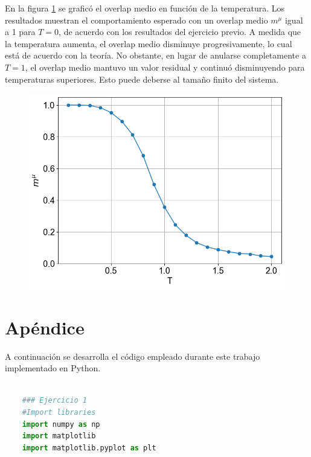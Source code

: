 \documentclass[aps,prb,twocolumn,superscriptaddress,floatfix,longbibliography]{revtex4-2}
\newcounter{para}
\begin{document}
En la figura \ref{fig:ej2_overlap_vs_T} se graficó el overlap medio en función de la temperatura. Los resultados muestran el comportamiento esperado con un overlap medio \( m^\mu \) igual a 1 para \( T = 0 \), de acuerdo con los resultados del ejercicio previo. A medida que la temperatura aumenta, el overlap medio disminuye progresivamente, lo cual está de acuerdo con la teoría. No obstante, en lugar de anularse completamente a \( T = 1 \), el overlap medio mantuvo un valor residual y continuó disminuyendo para temperaturas superiores. Esto puede deberse al tamaño finito del sistema.

\begin{figure}[h]
  \includegraphics[clip=true,width=\columnwidth]{../ej2_overlap_vs_T.png}
  \caption{}
   \label{fig:ej2_overlap_vs_T}
\end{figure}





\onecolumngrid


\section*{Apéndice}
A continuación se desarrolla el código empleado durante este trabajo implementado en Python.




\begin{lstlisting}[language=Python]
    
    ### Ejercicio 1
    #Import libraries
    import numpy as np
    import matplotlib
    import matplotlib.pyplot as plt
    
\end{lstlisting}


\end{document}
